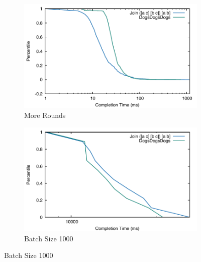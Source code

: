 \documentclass[../catalog.tex]{subfiles}
\begin{document}
\begin{figure}[h!]
  \begin{subfigure}{.5\textwidth}
    \includegraphics[width=1.0\linewidth]{results/triangles/out/extended_cdf}
    \caption{More Rounds}
  \end{subfigure}
  \begin{subfigure}{.5\textwidth}
    \includegraphics[width=1.0\linewidth]{results/triangles/out/batch_cdf}
    \caption{Batch Size 1000}
  \end{subfigure}

  \label{fig:triangle-cdfs-extended}
\end{figure}
\end{document}
